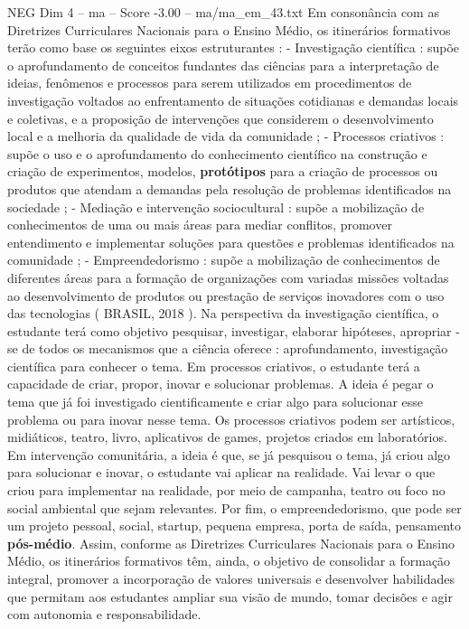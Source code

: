 \begin{textsample}{NEG Dim 4 – ma – Score -3.00 – ma/ma\_em\_43.txt}
Em consonância com as Diretrizes Curriculares Nacionais para o Ensino Médio, os itinerários formativos terão como base os seguintes eixos estruturantes : - Investigação científica : supõe o aprofundamento de conceitos fundantes das ciências para a interpretação de ideias, fenômenos e processos para serem utilizados em procedimentos de investigação voltados ao enfrentamento de situações cotidianas e demandas locais e coletivas, e a proposição de intervenções que considerem o desenvolvimento local e a melhoria da qualidade de vida da comunidade ; - Processos criativos : supõe o uso e o aprofundamento do conhecimento científico na construção e criação de experimentos, modelos, \textbf{protótipos} para a criação de processos ou produtos que atendam a demandas pela resolução de problemas identificados na sociedade ; - Mediação e intervenção sociocultural : supõe a mobilização de conhecimentos de uma ou mais áreas para mediar conflitos, promover entendimento e implementar soluções para questões e problemas identificados na comunidade ; - Empreendedorismo : supõe a mobilização de conhecimentos de diferentes áreas para a formação de organizações com variadas missões voltadas ao desenvolvimento de produtos ou prestação de serviços inovadores com o uso das tecnologias ( BRASIL, 2018 ).
Na perspectiva da investigação científica, o estudante terá como objetivo pesquisar, investigar, elaborar hipóteses, apropriar -se de todos os mecanismos que a ciência oferece : aprofundamento, investigação científica para conhecer o tema.
Em processos criativos, o estudante terá a capacidade de criar, propor, inovar e solucionar problemas.
A ideia é pegar o tema que já foi investigado cientificamente e criar algo para solucionar esse problema ou para inovar nesse tema.
Os processos criativos podem ser artísticos, midiáticos, teatro, livro, aplicativos de games, projetos criados em laboratórios.
Em intervenção comunitária, a ideia é que, se já pesquisou o tema, já criou algo para solucionar e inovar, o estudante vai aplicar na realidade.
Vai levar o que criou para implementar na realidade, por meio de campanha, teatro ou foco no social ambiental que sejam relevantes.
Por fim, o empreendedorismo, que pode ser um projeto pessoal, social, startup, pequena empresa, porta de saída, pensamento \textbf{pós-médio}.
Assim, conforme as Diretrizes Curriculares Nacionais para o Ensino Médio, os itinerários formativos têm, ainda, o objetivo de consolidar a formação integral, promover a incorporação de valores universais e desenvolver habilidades que permitam aos estudantes ampliar sua visão de mundo, tomar decisões e agir com autonomia e responsabilidade.

\end{textsample}

